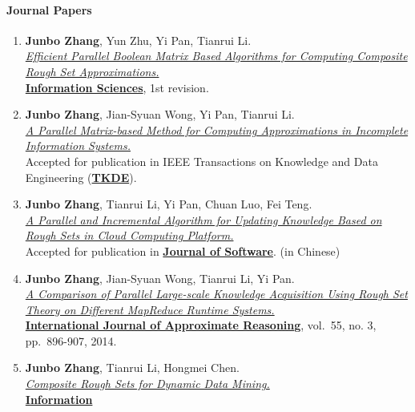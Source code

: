 \documentclass[10pt,a4paper]{article}
\begin{document}
\paragraph{Journal Papers}\label{journal-papers}

\begin{enumerate}
\def\labelenumi{\arabic{enumi}.}
\item
  \textbf{Junbo Zhang}, Yun Zhu, Yi Pan, Tianrui Li.\\
  \href{}{\emph{Efficient Parallel Boolean Matrix Based Algorithms for
  Computing Composite Rough Set Approximations.}}\\
  \href{http://www.journals.elsevier.com/information-sciences}{\textbf{Information
  Sciences}}, 1st revision.
\item
  \textbf{Junbo Zhang}, Jian-Syuan Wong, Yi Pan, Tianrui Li.\\
  \href{http://dx.doi.org/10.1109/TKDE.2014.2330821}{\emph{A Parallel
  Matrix-based Method for Computing Approximations in Incomplete
  Information Systems.}}\\ Accepted for publication in IEEE Transactions
  on Knowledge and Data Engineering
  (\href{http://www.computer.org/portal/web/tkde}{\textbf{TKDE}}).
\item
  \textbf{Junbo Zhang}, Tianrui Li, Yi Pan, Chuan Luo, Fei Teng.\\
  \href{http://dx.doi.org/10.13328/j.cnki.jos.004590}{\emph{A Parallel
  and Incremental Algorithm for Updating Knowledge Based on Rough Sets
  in Cloud Computing Platform.}}\\ Accepted for publication in
  \href{http://www.jos.org.cn/ch/index.aspx}{\textbf{Journal of
  Software}}. (in Chinese)
\item
  \textbf{Junbo Zhang}, Jian-Syuan Wong, Tianrui Li, Yi Pan.\\
  \href{http://dx.doi.org/10.1016/j.ijar.2013.08.003}{\emph{A Comparison
  of Parallel Large-scale Knowledge Acquisition Using Rough Set Theory
  on Different MapReduce Runtime Systems.}}\\
  \href{http://www.journals.elsevier.com/international-journal-of-approximate-reasoning}{\textbf{International
  Journal of Approximate Reasoning}}, vol.~55, no. 3, pp.~896-907, 2014.
\item
  \textbf{Junbo Zhang}, Tianrui Li, Hongmei Chen.\\
  \href{http://dx.doi.org/10.1016/j.ins.2013.08.016}{\emph{Composite
  Rough Sets for Dynamic Data Mining.}}\\
  \href{http://www.journals.elsevier.com/information-sciences}{\textbf{Information
}}
\end{enumerate}
\end{document}
